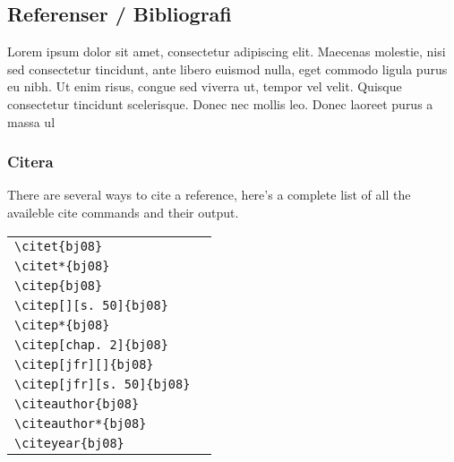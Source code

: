 \subsection{Referenser / Bibliografi}

Lorem ipsum dolor sit amet, consectetur adipiscing elit. Maecenas molestie, nisi sed consectetur tincidunt, ante libero euismod nulla, eget commodo ligula purus eu nibh. Ut enim risus, congue sed viverra ut, tempor vel velit. Quisque consectetur tincidunt scelerisque. Donec nec mollis leo. Donec laoreet purus a massa ul

\subsubsection{Citera}

There are several ways to cite a reference, here's a complete list of all the
availeble cite commands and their output.

\begin{tabular}{l l}
\verb+\citet{bj08}+ & \citet{bj08} \\
\verb+\citet*{bj08}+ & \citet*{bj08} \\
\verb+\citep{bj08}+ & \citep{bj08} \\
\verb+\citep[][s. 50]{bj08}+ & \citep[][s. 50]{bj08} \\
\verb+\citep*{bj08}+ & \citep*{bj08} \\
\verb+\citep[chap. 2]{bj08}+ & \citep[chap. 2]{bj08} \\
\verb+\citep[jfr][]{bj08}+ & \citep[jfr][]{bj08} \\
\verb+\citep[jfr][s. 50]{bj08}+ & \citep[jfr][s. 50]{bj08} \\
\verb+\citeauthor{bj08}+ & \citeauthor{bj08} \\
\verb+\citeauthor*{bj08}+ & \citeauthor*{bj08} \\
\verb+\citeyear{bj08}+ & \citeyear{bj08}
\end{tabular}

